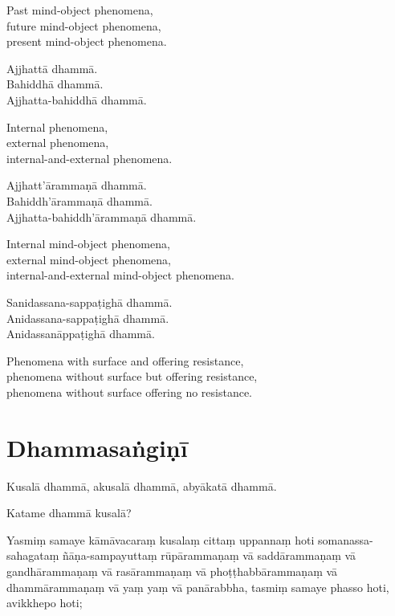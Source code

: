 \begin{english}
  Past mind-object phenomena,\\
  future mind-object phenomena,\\
  present mind-object phenomena.
\end{english}

Ajjhattā dhammā.\\
Bahiddhā dhammā.\\
Ajjhatta-bahiddhā dhammā.

\begin{english}
  Internal phenomena,\\
  external phenomena,\\
  internal-and-external phenomena.
\end{english}

Ajjhatt'ārammaṇā dhammā.\\
Bahiddh'ārammaṇā dhammā.\\
Ajjhatta-bahiddh'ārammaṇā dhammā.

\begin{english}
  Internal mind-object phenomena,\\
  external mind-object phenomena,\\
  internal-and-external mind-object phenomena.
\end{english}

Sanidassana-sappaṭighā dhammā.\\
Anidassana-sappaṭighā dhammā.\\
Anidassanāppaṭighā dhammā.

\begin{english}
  Phenomena with surface and offering resistance,\\
  phenomena without surface but offering resistance,\\
  phenomena without surface offering no resistance.
\end{english}


\section{Dhammasaṅgiṇī}

Kusalā dhammā, akusalā dhammā, abyākatā dhammā.

Katame dhammā kusalā?

Yasmiṃ samaye kāmāvacaraṃ kusalaṃ cittaṃ uppannaṃ hoti somanassa-sahagataṃ
ñāṇa-sampayuttaṃ rūpārammaṇaṃ vā saddārammaṇaṃ vā gandhārammaṇaṃ vā
rasārammaṇaṃ vā phoṭṭhabbārammaṇaṃ vā dhammārammaṇaṃ vā yaṃ yaṃ vā panārabbha,
tasmiṃ samaye phasso hoti, avikkhepo hoti;

